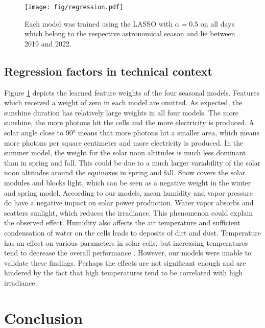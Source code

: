 \documentclass{article}
\begin{document}
\begin{figure}
	\texttt{[image: fig/regression.pdf]}
	\caption{Each model was trained using the LASSO with $\alpha = 0.5$ on all days which belong to the respective astronomical season and lie between 2019 and 2022.}\label{fig:coefficients}
\end{figure}

\subsection*{Regression factors in technical context}

Figure \ref{fig:coefficients} depicts the learned feature weights of the four seasonal models. Features which received a weight of zero in each model are omitted. As expected, the sunshine duration has relatively large weights in all four models. The more sunshine, the more photons hit the cells and the more electricity is produced. A solar angle close to 90° means that more photons hit a smaller area, which means more photons per square centimeter and more electricity is produced. In the summer model, the weight for the solar noon altitudes is much less dominant than in spring and fall. This could be due to a much larger variability of the solar noon altitudes around the equinoxes in spring and fall. Snow covers the solar modules and blocks light, which can be seen as a negative weight in the winter and spring model. According to our models, mean humidity and vapor pressure do have a negative impact on solar power production. Water vapor absorbs and scatters sunlight, which reduces the irradiance. This phenomenon could explain the observed effect. Humidity also affects the air temperature and sufficient condensation of water on the cells leads to deposits of dirt and dust. Temperature has an effect on various parameters in solar cells, but increasing temperatures tend to decrease the overall performance \cite{SolarAndTemperature}. However, our models were unable to validate these findings. Perhaps the effects are not significant enough and are hindered by the fact that high temperatures tend to be correlated with high irradiance.

\section{Conclusion}
\end{document}
